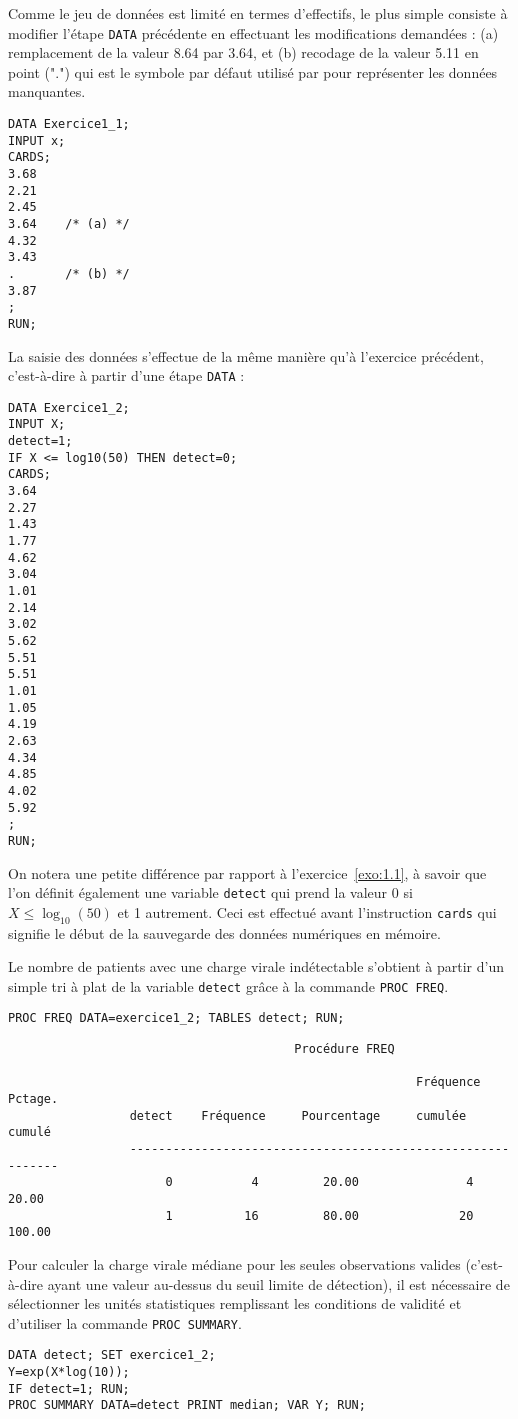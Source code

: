 Comme le jeu de données est limité en termes d'effectifs, le plus simple
consiste à modifier l'étape \texttt{DATA} précédente en effectuant les
modifications demandées : (a) remplacement de la valeur 8.64 par 3.64, et
(b) recodage de la valeur 5.11 en point (".") qui est le symbole par défaut
utilisé par \SAS pour représenter les données manquantes.
\begin{verbatim}
DATA Exercice1_1;
INPUT x;
CARDS;
3.68
2.21
2.45
3.64    /* (a) */
4.32
3.43
.       /* (b) */
3.87
;
RUN;
\end{verbatim}
%
%
%
\soln{\ref{exo:8.2}}
La saisie des données s'effectue de la même manière qu'à l'exercice
précédent, c'est-à-dire à partir d'une étape \texttt{DATA} :
\begin{verbatim}
DATA Exercice1_2;
INPUT X;
detect=1;
IF X <= log10(50) THEN detect=0;
CARDS;
3.64
2.27
1.43
1.77
4.62
3.04
1.01
2.14
3.02
5.62
5.51
5.51
1.01
1.05
4.19
2.63
4.34
4.85
4.02
5.92
;
RUN;
\end{verbatim}
On notera une petite différence par rapport à l'exercice~\ref{exo:1.1}, à
savoir que l'on définit également une variable \texttt{detect} qui prend la
valeur 0 si $X\le \log_{10}(50)$ et 1 autrement. Ceci est effectué avant
l'instruction \texttt{cards} qui signifie le début de la sauvegarde des
données numériques en mémoire.

Le nombre de patients avec une charge virale indétectable s'obtient à partir
d'un simple tri à plat de la variable \texttt{detect} grâce à la commande
\texttt{PROC FREQ}.
\begin{verbatim}
PROC FREQ DATA=exercice1_2; TABLES detect; RUN;
\end{verbatim}

\begin{verbatim}
                                        Procédure FREQ

                                                         Fréquence    Pctage.
                 detect    Fréquence     Pourcentage     cumulée      cumulé
                 ------------------------------------------------------------
                      0           4         20.00               4      20.00
                      1          16         80.00              20     100.00
\end{verbatim}

Pour calculer la charge virale médiane pour les seules observations valides
(c'est-à-dire ayant une valeur au-dessus du seuil limite de détection), il
est nécessaire de sélectionner les unités statistiques remplissant les
conditions de validité et d'utiliser la commande \texttt{PROC SUMMARY}.
\begin{verbatim}
DATA detect; SET exercice1_2;
Y=exp(X*log(10));
IF detect=1; RUN;
PROC SUMMARY DATA=detect PRINT median; VAR Y; RUN;
\end{verbatim}

